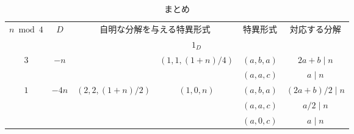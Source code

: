
\begin{table}[htb]
\caption{まとめ}
\centering
\begin{tabular}{|c|c|c|c|c|c|}\hline
\multirow{2}{*}{$n \bmod{4}$} & \multirow{2}{*}{$D$}   & \multicolumn{2}{c|}{自明な分解を与える特異形式}                     & \multirow{2}{*}{特異形式} & \multirow{2}{*}{対応する分解} \\ \cline{4-4}
                              &                        &                                  & $1_D$                            &                           &                               \\ \hline\hline
\multirow{2}{*}{$3$}          & \multirow{2}{*}{$-n$}  &                                  & \multirow{2}{*}{$(1,1,(1+n)/4)$} & $(a,b,a)$                 & $2a + b \mid n$               \\ \cline{5-6}
                              &                        &                                  &                                  & $(a,a,c)$                 & $a \mid n$                    \\ \hline
\multirow{3}{*}{$1$}          & \multirow{3}{*}{$-4n$} & \multirow{3}{*}{$(2,2,(1+n)/2)$} & \multirow{3}{*}{$(1,0,n)$}       & $(a,b,a)$                 & $(2a + b)/2 \mid n$           \\ \cline{5-6}
                              &                        &                                  &                                  & $(a,a,c)$                 & $a/2 \mid n$                  \\ \cline{5-6}
                              &                        &                                  &                                  & $(a,0,c)$                 & $a \mid n$                    \\ \hline
\end{tabular}
\end{table}
